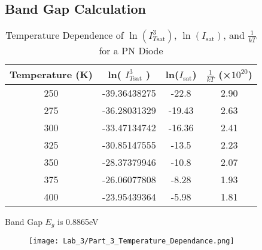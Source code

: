 \documentclass[a4paper]{article}
\begin{document}
\subsection{Band Gap Calculation}
\begin{table}[h!]
\centering
\begin{tabular}{|c|c|c|c|}
\hline
\textbf{Temperature (K)} & \textbf{ln( \( I_{T\text{sat}}^3 \) )} & \textbf{ln(\( I_{\text{sat}} \))} & \textbf{\( \frac{1}{kT} \) (×\(10^{20}\))} \\ \hline
250                      & -39.36438275                            & -22.8                            & 2.90 \\ \hline
275                      & -36.28031329                            & -19.43                           & 2.63 \\ \hline
300                      & -33.47134742                            & -16.36                           & 2.41 \\ \hline
325                      & -30.85147555                            & -13.5                            & 2.23 \\ \hline
350                      & -28.37379946                            & -10.8                            & 2.07 \\ \hline
375                      & -26.06077808                            & -8.28                            & 1.93 \\ \hline
400                      & -23.95439364                            & -5.98                            & 1.81 \\ \hline
\end{tabular}
\caption{Temperature Dependence of \( \ln( I_{T\text{sat}}^3 ) \), \( \ln(I_{\text{sat}}) \), and \( \frac{1}{kT} \) for a PN Diode}
\label{tab:temperature_dependence}
\end{table}

\newpage
Band Gap $E_{g}$ is 0.8865eV

\begin{figure}[h!]
    \centering
    \texttt{[image: Lab\_3/Part\_3\_Temperature\_Dependance.png]}
\end{figure}
\end{document}
